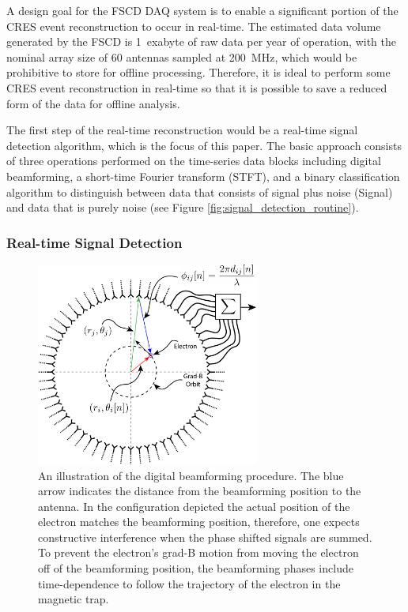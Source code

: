 A design goal for the FSCD DAQ system is to enable a significant portion of the CRES event reconstruction to occur in real-time. The estimated data volume generated by the FSCD is 1~exabyte of raw data per year of operation, with the nominal array size of 60 antennas sampled at 200~MHz, which would be prohibitive to store for offline processing. Therefore, it is ideal to perform some CRES event reconstruction in real-time so that it is possible to save a reduced form of the data for offline analysis.

The first step of the real-time reconstruction would be a real-time signal detection algorithm, which is the focus of this paper. The basic approach consists of three operations performed on the time-series data blocks including digital beamforming, a short-time Fourier transform (STFT), and a binary classification algorithm to distinguish between data that consists of signal plus noise (Signal) and data that is purely noise (see Figure \ref{fig:signal_detection_routine}).

\subsubsection{Real-time Signal Detection}
\label{sec:bf-and-stft}

\begin{figure}[htbp]
    \centering
    \includegraphics[width=0.65\textwidth]{figs/Chapter-4/230803_beamforming_diagram.png}
    \caption{An illustration of the digital beamforming procedure. The blue arrow indicates the distance from the beamforming position to the antenna. In the configuration depicted the actual position of the electron matches the beamforming position, therefore, one expects constructive interference when the phase shifted signals are summed. To prevent the electron's grad-B motion from moving the electron off of the beamforming position, the beamforming phases include time-dependence to follow the trajectory of the electron in the magnetic trap.}
    \label{fig:chap4-beamforming}
\end{figure}

